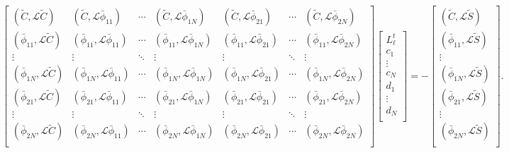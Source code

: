 \documentclass[Dissertation.tex]{subfiles}
\begin{document}
{\small
\begin{equation}
\label{eq:PWaveKohnMatrix}
	\begin{bmatrix} 
	 (\widetilde{C},\mathcal{L}\widetilde{C}) & (\widetilde{C},\mathcal{L}\bar{\phi}_{11}) & \cdots & (\widetilde{C},\mathcal{L}\bar{\phi}_{1N}) & (\widetilde{C},\mathcal{L}\bar{\phi}_{21}) & \cdots & (\widetilde{C},\mathcal{L}\bar{\phi}_{2N})\\
	 (\bar{\phi}_{11},\mathcal{L}\widetilde{C}) & (\bar{\phi}_{11},\mathcal{L}\bar{\phi}_{11}) & \cdots & (\bar{\phi}_{11},\mathcal{L}\bar{\phi}_{1N}) & (\bar{\phi}_{11},\mathcal{L}\bar{\phi}_{21}) & \cdots & (\bar{\phi}_{11},\mathcal{L}\bar{\phi}_{2N})\\
	 \vdots & \vdots & \ddots & \vdots & \vdots & \ddots & \vdots \\
	 (\bar{\phi}_{1N},\mathcal{L}\widetilde{C}) & (\bar{\phi}_{1N},\mathcal{L}\bar{\phi}_{11}) & \cdots & (\bar{\phi}_{1N},\mathcal{L}\bar{\phi}_{1N}) & (\bar{\phi}_{1N},\mathcal{L}\bar{\phi}_{21}) & \cdots & (\bar{\phi}_{1N},\mathcal{L}\bar{\phi}_{2N})\\
	 (\bar{\phi}_{21},\mathcal{L}\widetilde{C}) & (\bar{\phi}_{21},\mathcal{L}\bar{\phi}_{11}) & \cdots & (\bar{\phi}_{21},\mathcal{L}\bar{\phi}_{1N}) & (\bar{\phi}_{21},\mathcal{L}\bar{\phi}_{21}) & \cdots & (\bar{\phi}_{21},\mathcal{L}\bar{\phi}_{2N})\\
	 \vdots & \vdots & \ddots & \vdots & \vdots & \ddots & \vdots \\
	 (\bar{\phi}_{2N},\mathcal{L}\widetilde{C}) & (\bar{\phi}_{2N},\mathcal{L}\bar{\phi}_{11}) & \cdots & (\bar{\phi}_{2N},\mathcal{L}\bar{\phi}_{1N}) & (\bar{\phi}_{2N},\mathcal{L}\bar{\phi}_{21}) & \cdots & (\bar{\phi}_{2N},\mathcal{L}\bar{\phi}_{2N})\\
	\end{bmatrix}
	\begin{bmatrix}
  L_\ell^t\\
	c_1\\
	\vdots\\
	c_N\\
	d_1\\
	\vdots\\
	d_N\\
	\end{bmatrix}
	= -
	\begin{bmatrix}
	(\widetilde{C},\mathcal{L}\widetilde{S}) \\
	(\bar{\phi}_{11},\mathcal{L}\widetilde{S}) \\
	\vdots \\
	(\bar{\phi}_{1N},\mathcal{L}\widetilde{S}) \\
	(\bar{\phi}_{21},\mathcal{L}\widetilde{S}) \\
	\vdots \\
	(\bar{\phi}_{2N},\mathcal{L}\widetilde{S}) \\
	\end{bmatrix}.
\end{equation}
}
\end{document}
